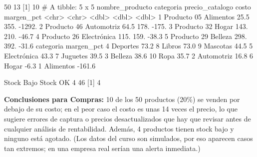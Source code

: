 \begin{rsalida}
[1] 50 13
[1] 10
# A tibble: 5 x 5
  nombre_producto categoria   precio_catalogo costo margen_pct
  <chr>           <chr>                 <dbl> <dbl>      <dbl>
1 Producto 05     Alimentos              25.5  355.    -1292. 
2 Producto 46     Automotriz             64.5  178.     -175. 
3 Producto 32     Hogar                 143.   210.      -46.7
4 Producto 26     Electrónica           115.   159.      -38.3
5 Producto 29     Belleza               298.   392.      -31.6
     categoria margen_pct
4     Deportes       73.2
8       Libros       73.0
9     Mascotas       44.5
5  Electrónica       43.3
7     Juguetes       39.5
3      Belleza       38.6
10        Ropa       35.7
2   Automotriz       16.8
6        Hogar       -6.3
1    Alimentos     -161.6

Stock Bajo   Stock OK 
         4         46 
[1] 4
\end{rsalida}

\textbf{Conclusiones para Compras:} 10 de los 50 productos (20\%) se venden
por debajo de su costo; en el peor caso el costo es unas 14 veces el
precio, lo que sugiere errores de captura o precios desactualizados que
hay que revisar antes de cualquier análisis de rentabilidad. Además, 4
productos tienen stock bajo y ninguno está agotado. (Los datos del curso
son simulados, por eso aparecen casos tan extremos; en una empresa real
serían una alerta inmediata.)



